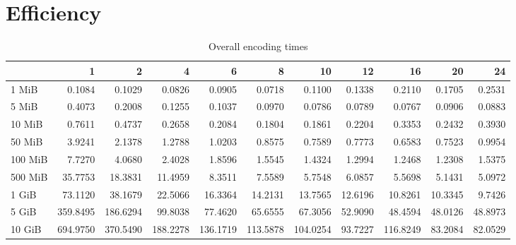 \onecolumn

\section{Efficiency}


\begin{table}[!h]
	\caption{Overall encoding times}
\begin{tabular}{lrrrrrrrrrr}
	\toprule
	\diagbox{File sizes }{Threads} &        1  &        2  &        4  &        6  &        8  &        10 &       12 &        16 &       20 &       24 \\
	\midrule
	1 MiB   &    0.1084 &    0.1029 &    0.0826 &    0.0905 &    0.0718 &    0.1100 &   0.1338 &    0.2110 &   0.1705 &   0.2531 \\
	5 MiB   &    0.4073 &    0.2008 &    0.1255 &    0.1037 &    0.0970 &    0.0786 &   0.0789 &    0.0767 &   0.0906 &   0.0883 \\
	10 MiB  &    0.7611 &    0.4737 &    0.2658 &    0.2084 &    0.1804 &    0.1861 &   0.2204 &    0.3353 &   0.2432 &   0.3930 \\
	50 MiB  &    3.9241 &    2.1378 &    1.2788 &    1.0203 &    0.8575 &    0.7589 &   0.7773 &    0.6583 &   0.7523 &   0.9954 \\
	100 MiB &    7.7270 &    4.0680 &    2.4028 &    1.8596 &    1.5545 &    1.4324 &   1.2994 &    1.2468 &   1.2308 &   1.5375 \\
	500 MiB &   35.7753 &   18.3831 &   11.4959 &    8.3511 &    7.5589 &    5.7548 &   6.0857 &    5.5698 &   5.1431 &   5.0972 \\
	1 GiB   &   73.1120 &   38.1679 &   22.5066 &   16.3364 &   14.2131 &   13.7565 &  12.6196 &   10.8261 &  10.3345 &   9.7426 \\
	5 GiB   &  359.8495 &  186.6294 &   99.8038 &   77.4620 &   65.6555 &   67.3056 &  52.9090 &   48.4594 &  48.0126 &  48.8973 \\
	10 GiB  &  694.9750 &  370.5490 &  188.2278 &  136.1719 &  113.5878 &  104.0254 &  93.7227 &  116.8249 &  83.2084 &  82.0529 \\
	\bottomrule
\end{tabular}
\end{table}
